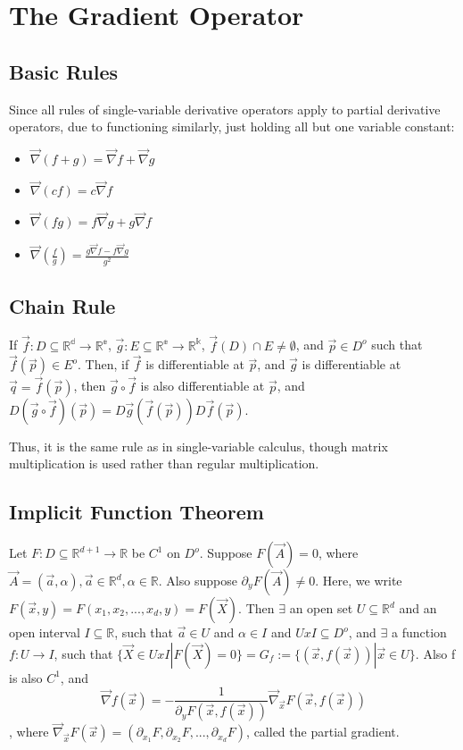 \documentclass[11 pt, twoside]{article}
\begin{document}
\section{The Gradient Operator}

\subsection{Basic Rules}

Since all rules of single-variable derivative operators apply to partial derivative operators, due to functioning similarly, just holding all but one variable constant:

\begin{itemize}
\item $\vec{\nabla}(f + g) = \vec{\nabla}f + \vec{\nabla}g$
\item $\vec{\nabla}(cf) = c\vec{\nabla}f$
\item $\vec{\nabla}(fg) = f\vec{\nabla}g + g\vec{\nabla}f$
\item $\vec{\nabla}(\frac{f}{g}) = \frac{g\vec{\nabla}f - f\vec{\nabla}g}{g^2}$
\end{itemize}

\subsection{Chain Rule}

If $\vec{f}: D \subseteq \mathbb{R^d} \to \mathbb{R^e}$, $\vec{g}: E \subseteq \mathbb{R^e} \to \mathbb{R^k}$, $\vec{f}(D) \cap E \neq \emptyset$, and $\vec{p} \in D^o$ such that $\vec{f}(\vec{p}) \in E^o$. Then, if $\vec{f}$ is differentiable at $\vec{p}$, and $\vec{g}$ is differentiable at $\vec{q} = \vec{f}(\vec{p})$, then $\vec{g} \circ \vec{f}$ is also differentiable at $\vec{p}$, and $D(\vec{g} \circ \vec{f})(\vec{p}) = D\vec{g}(\vec{f}(\vec{p}))D\vec{f}(\vec{p})$.

Thus, it is the same rule as in single-variable calculus, though matrix multiplication is used rather than regular multiplication.

\subsection{Implicit Function Theorem}
Let $F: D \subseteq \mathbb{R}^{d+1} \to \mathbb{R}$ be $C^1$ on $D^o$. Suppose $F(\vec{A}) = 0$, where $\vec{A} = (\vec{a}, \alpha), \vec{a} \in \mathbb{R}^d, \alpha \in \mathbb{R}$. Also suppose $\partial_yF(\vec{A}) \neq 0$. Here, we write $F(\vec{x}, y) = F(x_1, x_2, ..., x_d, y) = F(\vec{X})$. Then $\exists$ an open set $U \subseteq \mathbb{R}^d$ and an open interval $I \subseteq \mathbb{R}$, such that $\vec{a} \in U$ and $\alpha \in I$ and $U x I \subseteq D^o$, and $\exists$ a function $f: U \to I$, such that $\{\vec{X} \in U x I|F(\vec{X}) = 0\} = G_f := \{(\vec{x}, f(\vec{x}))|\vec{x} \in U\}$. Also f is also $C^1$, and $$\vec{\nabla}f(\vec{x}) = -\frac{1}{\partial_yF(\vec{x}, f(\vec{x}))}\vec{\nabla}_\vec{x}F(\vec{x}, f(\vec{x}))$$, where $\vec{\nabla}_\vec{x}F(\vec{x}) = (\partial_{x_1}F, \partial_{x_2}F, ..., \partial_{x_d}F)$, called the partial gradient.
\end{document}
